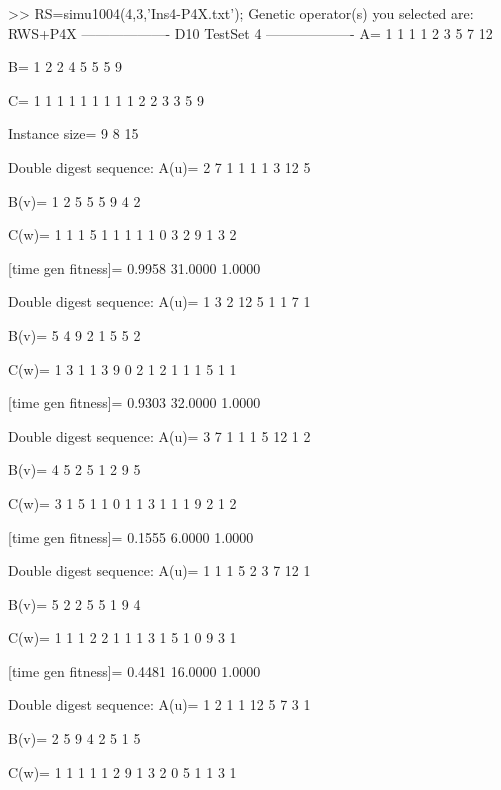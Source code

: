 >> RS=simu1004(4,3,'Ins4-P4X.txt');
Genetic operator(s) you selected are:
RWS+P4X
------------------- D10 TestSet 4 -------------------
A=
     1     1     1     1     2     3     5     7    12

B=
     1     2     2     4     5     5     5     9

C=
     1     1     1     1     1     1     1     1     1     2     2     3     3     5     9

Instance size=
     9     8    15

Double digest sequence:
A(u)=
     2     7     1     1     1     1     3    12     5

B(v)=
     1     2     5     5     5     9     4     2

C(w)=
     1     1     1     5     1     1     1     1     1     0     3     2     9     1     3     2

[time gen fitness]=
    0.9958   31.0000    1.0000

Double digest sequence:
A(u)=
     1     3     2    12     5     1     1     7     1

B(v)=
     5     4     9     2     1     5     5     2

C(w)=
     1     3     1     1     3     9     0     2     1     2     1     1     1     5     1     1

[time gen fitness]=
    0.9303   32.0000    1.0000

Double digest sequence:
A(u)=
     3     7     1     1     1     5    12     1     2

B(v)=
     4     5     2     5     1     2     9     5

C(w)=
     3     1     5     1     1     0     1     1     3     1     1     1     9     2     1     2

[time gen fitness]=
    0.1555    6.0000    1.0000

Double digest sequence:
A(u)=
     1     1     1     5     2     3     7    12     1

B(v)=
     5     2     2     5     5     1     9     4

C(w)=
     1     1     1     2     2     1     1     1     3     1     5     1     0     9     3     1

[time gen fitness]=
    0.4481   16.0000    1.0000

Double digest sequence:
A(u)=
     1     2     1     1    12     5     7     3     1

B(v)=
     2     5     9     4     2     5     1     5

C(w)=
     1     1     1     1     1     2     9     1     3     2     0     5     1     1     3     1

